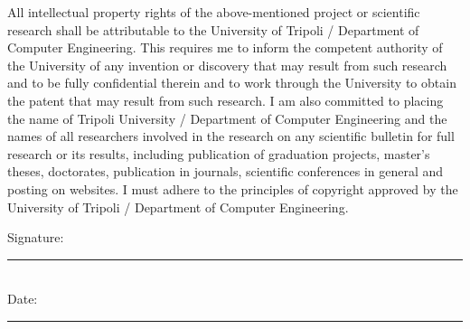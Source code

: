 \begin{titlepage}
\begin{singlespace}
\noindent All intellectual property rights of the above-mentioned project or scientific
research shall be attributable to the University of Tripoli / Department of
Computer Engineering. This requires me to inform the competent authority of the
University of any invention or discovery that may result from such research and
to be fully confidential therein and to work through the University to obtain the
patent that may result from such research. I am also committed to placing the name
of Tripoli University / Department of Computer Engineering and the names of all
researchers involved in the research on any scientific bulletin for full research
or its results, including publication of graduation projects, master's theses,
doctorates, publication in journals, scientific conferences in general and posting
on websites. I must adhere to the principles of copyright approved by the
University of Tripoli / Department of Computer Engineering.

\vspace{0.35cm}
\noindent Signature: \rule{0.48\textwidth}{0.4pt}\\[0.45cm]
Date: \rule{0.56\textwidth}{0.4pt}
\end{singlespace}
\end{titlepage}

